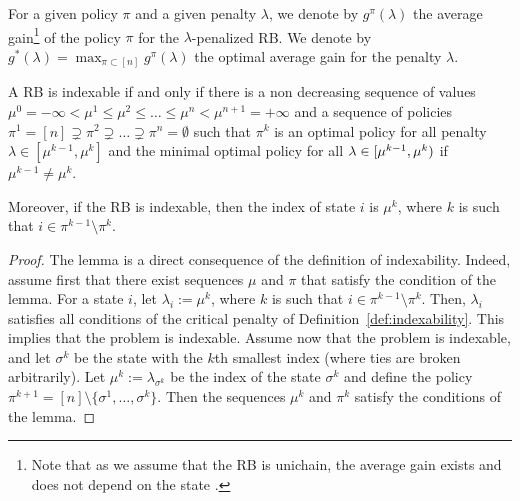 \documentclass[acmsmall,screen,anonymous]{acmart}
\begin{document}
For a given policy $\pi$ and a given penalty $\lambda$, we denote by $g^\pi(\lambda)$ the average gain\footnote{Note that as we assume that the RB is unichain, the average gain exists and does not depend on the state \cite{putermanMarkovDecisionProcesses1994}.} of the policy $\pi$ for the $\lambda$-penalized RB. We denote by $g^*(\lambda)=\max_{\pi\subset[n]}g^\pi(\lambda)$ the optimal average gain for the penalty $\lambda$.
\begin{lemma}
    \label{lem:indexable}
    A RB is indexable if and only if there is a non decreasing sequence of values $\mu^0=-\infty<\mu^1\le\mu^2\le\dots\le\mu^n<\mu^{n+1}=+\infty$ and a sequence of policies $\pi^1=[n]\supsetneq\pi^2\supsetneq\dots\supsetneq\pi^n=\emptyset$ such that $\pi^k$ is an optimal policy for all penalty $\lambda\in[\mu^{k-1},\mu^{k}]$ and the minimal optimal policy for all $\lambda\in[\mu^{k-1},\mu^k)$ if $\mu^{k-1}\ne\mu^{k}$.

    Moreover, if the RB is indexable, then the index of state $i$ is $\mu^k$, where $k$ is such that $i \in \pi^{k-1}\setminus \pi^{k}$.
\end{lemma}
\begin{proof}
    The lemma is a direct consequence of the definition of indexability.  Indeed, assume first that there exist sequences $\mu$ and $\pi$ that satisfy the condition of the lemma. For a state $i$, let $\lambda_i := \mu^k$, where $k$ is such that $i \in \pi^{k-1}\setminus \pi^{k}$. Then, $\lambda_i$ satisfies all conditions of the critical penalty of Definition~\ref{def:indexability}.  This implies that the problem is indexable. Assume now that the problem is indexable, and let $\sigma^k$ be the state with the $k$th smallest index (where ties are broken arbitrarily). Let $\mu^k:=\lambda_{\sigma^k}$ be the index of the state $\sigma^k$ and define the policy $\pi^{k+1}=[n]\setminus\{\sigma^1,\dots, \sigma^k\}$. Then the sequences $\mu^k$ and $\pi^k$ satisfy the conditions of the lemma. 
\end{proof}
\end{document}
